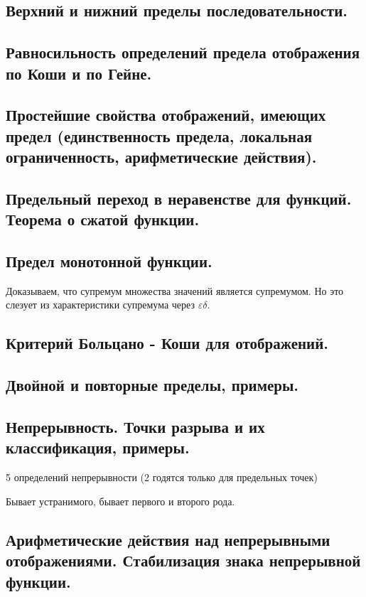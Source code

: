 \documentclass[12pt, a4paper]{article}
\begin{document}
\subsection{Верхний и нижний пределы последовательности.}

\subsection{Равносильность определений предела отображения по Коши и по Гейне.}

\subsection{Простейшие свойства отображений, имеющих предел (единственность предела, локальная ограниченность, арифметические действия).}

\subsection{Предельный переход в неравенстве для функций. Теорема о сжатой функции.}

\subsection{Предел монотонной функции.}

Доказываем, что супремум множества значений является супремумом. 
Но это слезует из характеристики супремума через $\varepsilon\delta$.


\subsection{Критерий Больцано - Коши для отображений.}

\subsection{Двойной и повторные пределы, примеры.}

\subsection{Непрерывность. Точки разрыва и их классификация, примеры.}

5 определений непрерывности (2 годятся только для предельных точек)

Бывает устранимого, бывает первого и второго рода.

\subsection{Арифметические действия над непрерывными отображениями. Стабилизация знака непрерывной функции.}
\end{document}
